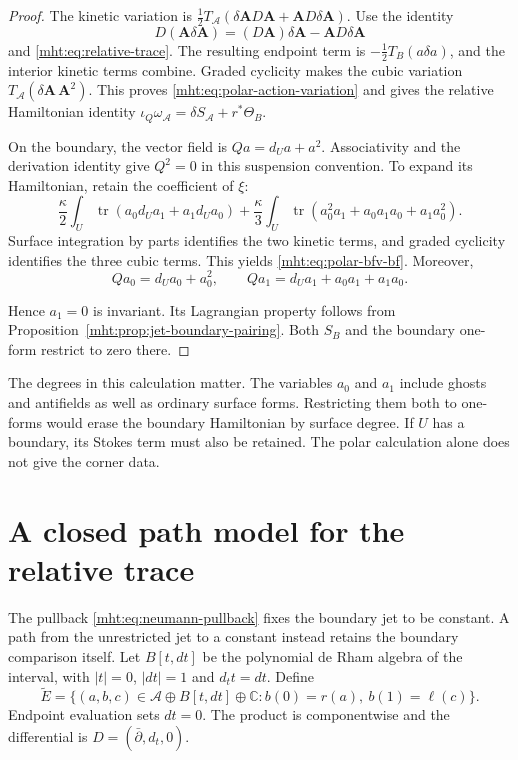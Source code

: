 \begin{proof}
The kinetic variation is
$\tfrac12T_{\mathcal A}(\delta\mathbf A D\mathbf A
                      +\mathbf A D\delta\mathbf A)$.
Use the identity
\[
 D(\mathbf A\delta\mathbf A)
       =(D\mathbf A)\delta\mathbf A-\mathbf A D\delta\mathbf A
\]
and \eqref{mht:eq:relative-trace}. The resulting endpoint term is
$-\tfrac12T_B(a\delta a)$, and the interior kinetic terms combine.
Graded cyclicity makes the cubic variation
$T_{\mathcal A}(\delta\mathbf A\,\mathbf A^2)$.
This proves \eqref{mht:eq:polar-action-variation} and gives the relative
Hamiltonian identity
$\iota_Q\omega_{\mathcal A}=\delta S_{\mathcal A}+r^*\Theta_B$.

On the boundary, the vector field is $Qa=d_Ua+a^2$.
Associativity and the derivation identity give $Q^2=0$ in this
suspension convention. To expand its Hamiltonian, retain the coefficient
of $\xi$:
\[
 \frac{\kappa}{2}\int_U\operatorname{tr}
           (a_0d_Ua_1+a_1d_Ua_0)
 +\frac{\kappa}{3}\int_U\operatorname{tr}
           (a_0^2a_1+a_0a_1a_0+a_1a_0^2).
\]
Surface integration by parts identifies the two kinetic terms, and
graded cyclicity identifies the three cubic terms. This yields
\eqref{mht:eq:polar-bfv-bf}. Moreover,
\[
 Qa_0=d_Ua_0+a_0^2,\qquad
 Qa_1=d_Ua_1+a_0a_1+a_1a_0.
\]

Hence $a_1=0$ is invariant. Its Lagrangian property follows from
Proposition~\ref{mht:prop:jet-boundary-pairing}. Both $S_B$ and the
boundary one-form restrict to zero there.
\end{proof}

The degrees in this calculation matter. The variables $a_0$ and $a_1$
include ghosts and antifields as well as ordinary surface forms.
Restricting them both to one-forms would erase the boundary Hamiltonian
by surface degree. If $U$ has a boundary, its Stokes term must also be
retained. The polar calculation alone does not give the corner data.

\section{A closed path model for the relative trace}

The pullback \eqref{mht:eq:neumann-pullback} fixes the boundary jet to
be constant. A path from the unrestricted jet to a constant instead
retains the boundary comparison itself. Let $B[t,dt]$ be the polynomial
de Rham algebra of the interval, with $|t|=0$, $|dt|=1$ and
$d_t t=dt$. Define
\begin{equation}\label{mht:eq:relative-path-algebra}
 \widetilde E=\bigl\{(a,b,c)\in
     \mathcal A\oplus B[t,dt]\oplus\mathbb C:
                  b(0)=r(a),\ b(1)=\ell(c)\bigr\}.
\end{equation}
Endpoint evaluation sets $dt=0$. The product is componentwise and the
differential is $D=(\bar\partial,d_t,0)$.

